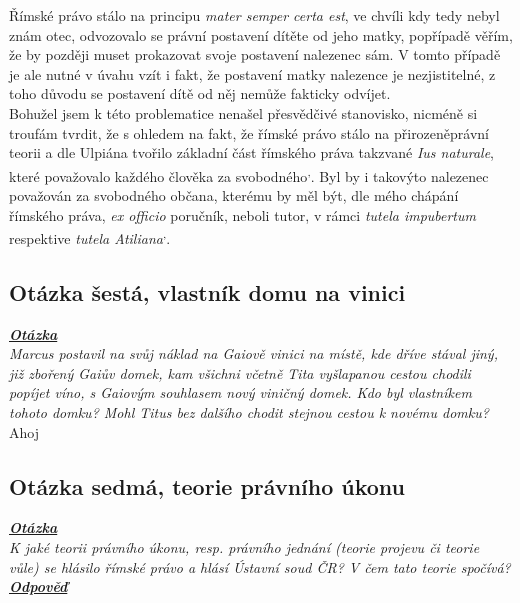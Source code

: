 \documentclass{article}
\begin{document}
Římské právo stálo na principu \textit{mater semper certa est}, ve chvíli kdy tedy nebyl znám otec, odvozovalo se právní postavení dítěte od jeho matky, popřípadě věřím, že by později muset prokazovat svoje postavení nalezenec sám. V tomto případě je ale nutné v úvahu vzít i fakt, že postavení matky nalezence je nezjistitelné, z toho důvodu se postavení dítě od něj nemůže fakticky odvíjet.\\

Bohužel jsem k této problematice nenašel přesvědčivé stanovisko, nicméně si troufám tvrdit, že s ohledem na fakt, že římské právo stálo na přirozeněprávní teorii a dle Ulpiána tvořilo základní část římského práva takzvané \textit{Ius naturale}, které považovalo každého člověka za svobodného\textsuperscript{,}. Byl by i takovýto nalezenec považován za svobodného občana, kterému by měl být, dle mého chápání římského práva, \textit{ex officio} poručník, neboli tutor, v rámci \textit{tutela impubertum} respektive \textit{tutela Atiliana}\textsuperscript{,}.

\subsection{Otázka šestá, vlastník domu na vinici}
\textbf{\textit{\underline{Otázka}}}\\
\textit{Marcus postavil na svůj náklad na Gaiově vinici na místě, kde dříve stával jiný, již zbořený Gaiův domek, kam všichni včetně Tita vyšlapanou cestou chodili popíjet víno, s Gaiovým souhlasem nový viničný domek. Kdo byl vlastníkem tohoto domku? Mohl Titus bez dalšího chodit stejnou cestou k novému domku?}\\
Ahoj

\subsection{Otázka sedmá, teorie právního úkonu}
\textbf{\textit{\underline{Otázka}}}\\
\textit{K jaké teorii právního úkonu, resp. právního jednání (teorie projevu či teorie vůle) se hlásilo římské právo a hlásí Ústavní soud ČR? V čem tato teorie spočívá?}\\

\noindent\noindent\textbf{\textit{\underline{Odpověď}}}\\
\end{document}
